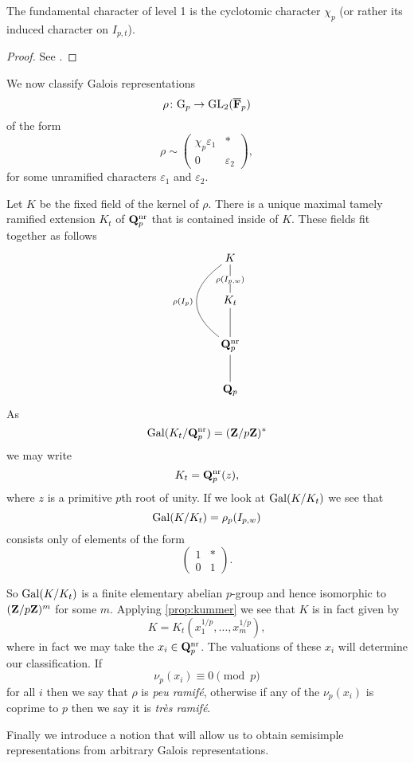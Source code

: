 \documentclass[a4paper,12pt]{article}
\begin{document}
\begin{prop}
The fundamental character of level 1 is the cyclotomic character $\chi_p$ (or rather its induced character on $I_{p,t}$).
\end{prop}
\begin{proof}
See \cite[prop. 8]{Serre72}.
\end{proof}


\begin{defn}
We now classify Galois representations
\[
\rho\colon\mathrm{G}_p\to\operatorname{GL}_2(\overline{\mathbf{F}}_p)
\]
of the form
\[
\rho\sim
\begin{pmatrix}
\chi_p\varepsilon_1 & * \\
0 & \varepsilon_2\end{pmatrix},
\]
for some unramified characters $\varepsilon_1$ and $\varepsilon_2$.

Let $K$ be the fixed field of the kernel of $\rho$.
There is a unique maximal tamely ramified extension $K_t$ of $\mathbf{Q}_p^{\mathrm{nr}}$ that is contained inside of $K$.
These fields fit together as follows
\[
\xymatrix{
K      \ar@{-}[d]|{\rho(I_{p,w})} \ar@{-}@/_2.5pc/[dd]_{\rho(I_{p})}\\
K_t \ar@{-}[d] \\
\Qp^\nr \ar@{-}[d]\\
\Qp \\
}
\]
As
\[
\operatorname{Gal}(K_t/\mathbf{Q}_p^{\mathrm{nr}}) = (\mathbf{Z}/p\mathbf{Z})^*
\]
we may write
\[
K_t = \mathbf{Q}_p^{\mathrm{nr}}(z),
\]
where $z$ is a primitive $p$th root of unity.
If we look at $\operatorname{Gal}(K/K_t)$ we see that
\[
\operatorname{Gal}(K/K_t) = \rho_p(I_{p,w})
\]
consists only of elements of the form
\[
\begin{pmatrix}
1 & * \\
0 & 1 \end{pmatrix}.
\]

So $\operatorname{Gal}(K/K_t)$ is a finite elementary abelian $p$-group and hence isomorphic to $(\mathbf{Z}/p\mathbf{Z})^m$ for some $m$.
Applying \cref{prop:kummer} we see that $K$ is in fact given by
\[
K = K_t(x_1^{1/p},\ldots,x_m^{1/p}),
\]
where in fact we may take the $x_i\in\mathbf{Q}_p^{\mathrm{nr}}$.
The valuations of these $x_i$ will determine our classification.
If
\[
\nu_p(x_i) \equiv 0 \pmod{p}
\]
for all $i$ then we say that $\rho$ is \emph{peu ramif\'e}, otherwise if any of the $\nu_p(x_i)$ is coprime to $p$ then we say it is \emph{tr\`es ramif\'e}.
\end{defn}

Finally we introduce a notion that will allow us to obtain semisimple representations from arbitrary Galois representations.
\end{document}
